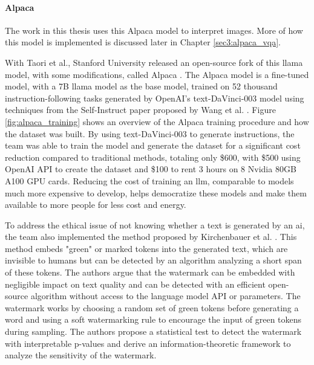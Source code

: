    \paragraph{Alpaca\\}
    The work in this thesis uses this Alpaca model to interpret images. More of how this model is implemented is discussed later in Chapter \ref{sec3:alpaca_vqa}.
    
    With Taori et al., Stanford University released an open-source fork of this \gls{llama} model, with some modifications, called Alpaca \cite{taoriStanfordCRFM, taoriStanfordAlpacaInstructionfollowing2023}. The Alpaca model is a fine-tuned model, with a 7B \gls{llama} model as the base model, trained on 52 thousand instruction-following tasks generated by OpenAI's text-DaVinci-003 model \cite{OpenAIAPI} using techniques from the Self-Instruct paper proposed by Wang et al. \cite{wangSelfInstructAligningLanguage2022}. Figure \ref{fig:alpaca_training} shows an overview of the Alpaca training procedure and how the dataset was built. By using text-DaVinci-003 to generate instructions, the team was able to train the model and generate the dataset for a significant cost reduction compared to traditional methods, totaling only \$600, with \$500 using OpenAI API to create the dataset and \$100 to rent 3 hours on 8 Nvidia 80GB A100 GPU cards. Reducing the cost of training an \gls{llm}, comparable to models much more expensive to develop, helps democratize these models and make them available to more people for less cost and energy.

    
    To address the ethical issue of not knowing whether a text is generated by an \gls{ai}, the team also implemented the method proposed by Kirchenbauer et al. \cite{kirchenbauerWatermarkLargeLanguage2023}. This method embeds "green" or marked tokens into the generated text, which are invisible to humans but can be detected by an algorithm analyzing a short span of these tokens.  
    The authors argue that the watermark can be embedded with negligible impact on text quality and can be detected with an efficient open-source algorithm without access to the language model API or parameters. The watermark works by choosing a random set of green tokens before generating a word and using a soft watermarking rule to encourage the input of green tokens during sampling. The authors propose a statistical test to detect the watermark with interpretable p-values and derive an information-theoretic framework to analyze the sensitivity of the watermark.

